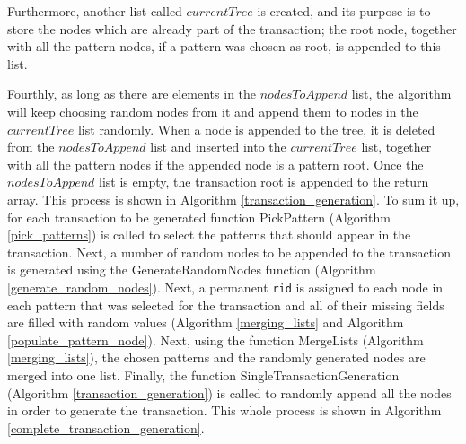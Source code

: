 \documentclass{acm_proc_article-sp-sigmod09}
\begin{document}
Furthermore, another list called $currentTree$ is created, and its purpose is to store the nodes which are already part of the transaction; the root node, together with all the pattern nodes, if a pattern was chosen as root, is appended to this list.

Fourthly, as long as there are elements in the $nodesToAppend$ list, the algorithm will keep choosing random nodes from it and append them to nodes in the $currentTree$ list randomly. When a node is appended to the tree, it is deleted from the $nodesToAppend$ list and inserted into the $currentTree$ list, together with all the pattern nodes if the appended node is a pattern root. Once the $nodesToAppend$ list is empty, the transaction root is appended to the return array. This process is shown in Algorithm \ref{transaction_generation}. To sum it up, for each transaction to be generated function PickPattern (Algorithm \ref{pick_patterns}) is called to select the patterns that should appear in the transaction. Next, a number of random nodes to be appended to the transaction is generated using the GenerateRandomNodes function (Algorithm \ref{generate_random_nodes}). Next, a permanent \texttt{rid} is assigned to each node in each pattern that was selected for the transaction and all of their missing fields are filled with random values (Algorithm \ref{merging_lists} and Algorithm \ref{populate_pattern_node}). Next, using the function MergeLists (Algorithm \ref{merging_lists}), the chosen patterns and the randomly generated nodes are merged into one list. Finally, the function SingleTransactionGeneration (Algorithm \ref{transaction_generation}) is called to randomly append all the nodes in order to generate the transaction. This whole process is shown in Algorithm \ref{complete_transaction_generation}.
\end{document}
